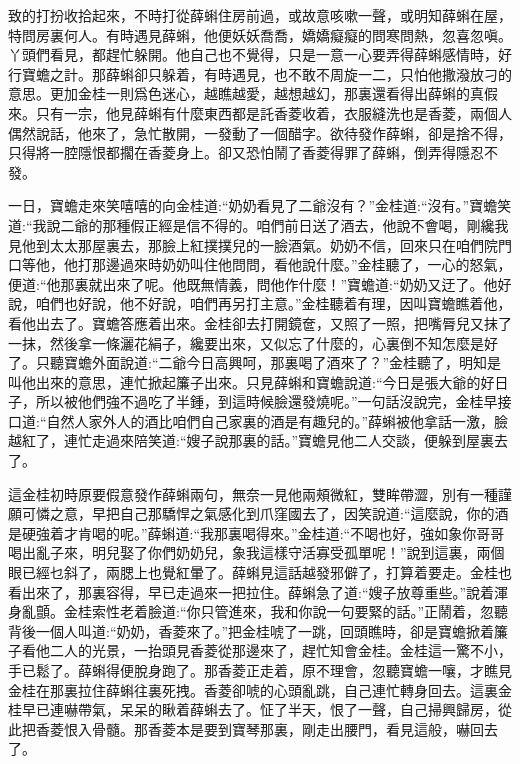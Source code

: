 \begin{parag}
致的打扮收拾起來，不時打從薛蝌住房前過，或故意咳嗽一聲，或明知薛蝌在屋，特問房裏何人。有時遇見薛蝌，他便妖妖喬喬，嬌嬌癡癡的問寒問熱，忽喜忽嗔。丫頭們看見，都趕忙躲開。他自己也不覺得，只是一意一心要弄得薛蝌感情時，好行寶蟾之計。那薛蝌卻只躲着，有時遇見，也不敢不周旋一二，只怕他撒潑放刁的意思。更加金桂一則爲色迷心，越瞧越愛，越想越幻，那裏還看得出薛蝌的真假來。只有一宗，他見薛蝌有什麼東西都是託香菱收着，衣服縫洗也是香菱，兩個人偶然說話，他來了，急忙散開，一發動了一個醋字。欲待發作薛蝌，卻是捨不得，只得將一腔隱恨都擱在香菱身上。卻又恐怕鬧了香菱得罪了薛蝌，倒弄得隱忍不發。
\end{parag}


\begin{parag}
    一日，寶蟾走來笑嘻嘻的向金桂道:“奶奶看見了二爺沒有？”金桂道:“沒有。”寶蟾笑道:“我說二爺的那種假正經是信不得的。咱們前日送了酒去，他說不會喝，剛纔我見他到太太那屋裏去，那臉上紅撲撲兒的一臉酒氣。奶奶不信，回來只在咱們院門口等他，他打那邊過來時奶奶叫住他問問，看他說什麼。”金桂聽了，一心的怒氣，便道:“他那裏就出來了呢。他既無情義，問他作什麼！”寶蟾道:“奶奶又迂了。他好說，咱們也好說，他不好說，咱們再另打主意。”金桂聽着有理，因叫寶蟾瞧着他，看他出去了。寶蟾答應着出來。金桂卻去打開鏡奩，又照了一照，把嘴脣兒又抹了一抹，然後拿一條灑花絹子，纔要出來，又似忘了什麼的，心裏倒不知怎麼是好了。只聽寶蟾外面說道:“二爺今日高興呵，那裏喝了酒來了？”金桂聽了，明知是叫他出來的意思，連忙掀起簾子出來。只見薛蝌和寶蟾說道:“今日是張大爺的好日子，所以被他們強不過吃了半鍾，到這時候臉還發燒呢。”一句話沒說完，金桂早接口道:“自然人家外人的酒比咱們自己家裏的酒是有趣兒的。”薛蝌被他拿話一激，臉越紅了，連忙走過來陪笑道:“嫂子說那裏的話。”寶蟾見他二人交談，便躲到屋裏去了。
\end{parag}


\begin{parag}
    這金桂初時原要假意發作薛蝌兩句，無奈一見他兩頰微紅，雙眸帶澀，別有一種謹願可憐之意，早把自己那驕悍之氣感化到爪窪國去了，因笑說道:“這麼說，你的酒是硬強着才肯喝的呢。”薛蝌道:“我那裏喝得來。”金桂道:“不喝也好，強如象你哥哥喝出亂子來，明兒娶了你們奶奶兒，象我這樣守活寡受孤單呢！”說到這裏，兩個眼已經乜斜了，兩腮上也覺紅暈了。薛蝌見這話越發邪僻了，打算着要走。金桂也看出來了，那裏容得，早已走過來一把拉住。薛蝌急了道:“嫂子放尊重些。”說着渾身亂顫。金桂索性老着臉道:“你只管進來，我和你說一句要緊的話。”正鬧着，忽聽背後一個人叫道:“奶奶，香菱來了。”把金桂唬了一跳，回頭瞧時，卻是寶蟾掀着簾子看他二人的光景，一抬頭見香菱從那邊來了，趕忙知會金桂。金桂這一驚不小，手已鬆了。薛蝌得便脫身跑了。那香菱正走着，原不理會，忽聽寶蟾一嚷，才瞧見金桂在那裏拉住薛蝌往裏死拽。香菱卻唬的心頭亂跳，自己連忙轉身回去。這裏金桂早已連嚇帶氣，呆呆的瞅着薛蝌去了。怔了半天，恨了一聲，自己掃興歸房，從此把香菱恨入骨髓。那香菱本是要到寶琴那裏，剛走出腰門，看見這般，嚇回去了。
\end{parag}


